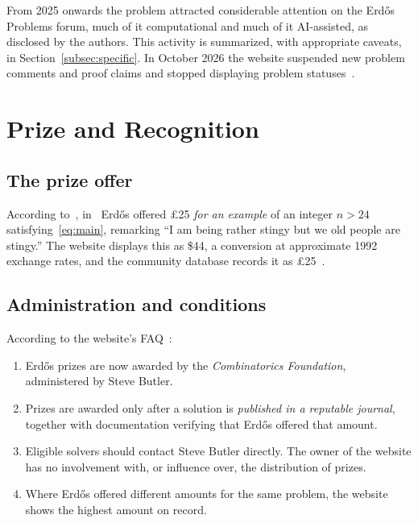 \documentclass[11pt]{amsart}
\theoremstyle{plain}
\theoremstyle{definition}
\theoremstyle{remark}
\numberwithin{equation}{section}
\begin{document}
From 2025 onwards the problem attracted considerable attention on the Erd\H{o}s Problems forum, much of it computational and much of it AI-assisted, as disclosed by the authors. This activity is summarized, with appropriate caveats, in Section~\ref{subsec:specific}. In October 2026 the website suspended new problem comments and proof claims and stopped displaying problem statuses~\cite{BloomChanges2026}.

\section{Prize and Recognition}\label{sec:prize}

\subsection{The prize offer}
According to~\cite{Bloom647}, in~\cite{Erdos1992Eureka} Erd\H{o}s offered \pounds 25 \emph{for an example} of an integer $n>24$ satisfying~\eqref{eq:main}, remarking ``I am being rather stingy but we old people are stingy.'' The website displays this as \$44, a conversion at approximate 1992 exchange rates, and the community database records it as \pounds 25~\cite{TeorthDatabase}.

\subsection{Administration and conditions}
According to the website's FAQ~\cite{BloomFAQ}:
\begin{enumerate}[label=(\roman*)]
  \item Erd\H{o}s prizes are now awarded by the \emph{Combinatorics Foundation}, administered by Steve Butler.
  \item Prizes are awarded only after a solution is \emph{published in a reputable journal}, together with documentation verifying that Erd\H{o}s offered that amount.
  \item Eligible solvers should contact Steve Butler directly. The owner of the website has no involvement with, or influence over, the distribution of prizes.
  \item Where Erd\H{o}s offered different amounts for the same problem, the website shows the highest amount on record.
\end{enumerate}
\end{document}
